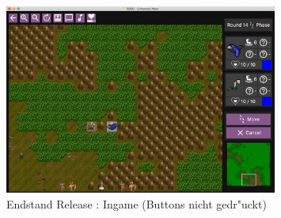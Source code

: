 \documentclass[12pt, titlepage]{scrartcl}
\newcommand{\RN}[1]{%
	\textup{\uppercase\expandafter{\romannumeral#1}}%
}
\begin{document}
			\begin{figure}[H] 
				\centering
				\includegraphics[width=0.8\textwidth]{images/endOfRelease/Ingame2.png}
				\caption{Endstand Release \RN{3}: Ingame (Buttons nicht gedr"uckt)}
				\label{End_Ingame_View_2}
			\end{figure}
\end{document}
